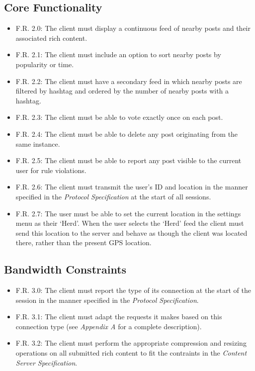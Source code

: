 \documentclass[12pt, a4paper]{article}
\begin{document}
\subsection{Core Functionality}
\begin{itemize}
\item F.R. 2.0: The client must display a continuous feed of nearby posts and their associated rich content.
\item F.R. 2.1: The client must include an option to sort nearby posts by popularity or time.
\item F.R. 2.2: The client must have a secondary feed in which nearby posts are filtered by hashtag and ordered by the number of nearby posts with a hashtag.
\item F.R. 2.3: The client must be able to vote exactly once on each post.
\item F.R. 2.4: The client must be able to delete any post originating from the same instance.
\item F.R. 2.5: The client must be able to report any post visible to the current user for rule violations.
\item F.R. 2.6: The client must transmit the user's ID and location in the manner specified in the \textit{Protocol Specification} at the start of all sessions.
\item F.R. 2.7: The user must be able to set the current location in the settings menu as their `Herd'. When the user selects the `Herd' feed the client must send this location to the server and behave as though the client was located there, rather than the present GPS location. 
\end{itemize}
\subsection{Bandwidth Constraints}
\begin{itemize}
\item F.R. 3.0: The client must report the type of its connection at the start of the session in the manner specified in the \textit{Protocol Specification}.
\item F.R. 3.1: The client must adapt the requests it makes based on this connection type (see \textit{Appendix A} for a complete description).
\item F.R. 3.2: The client must perform the appropriate compression and resizing operations on all submitted rich content to fit the contraints in the \textit{Content Server Specification}.
\end{itemize}
\clearpage
\end{document}
